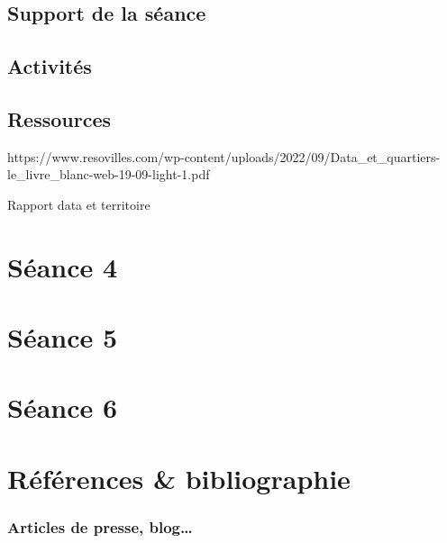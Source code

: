 \documentclass[
  letterpaper,
  DIV=11,
  numbers=noendperiod]{scrreprt}
\begin{document}
\hypertarget{support-de-la-suxe9ance-1}{%
\section{Support de la séance}\label{support-de-la-suxe9ance-1}}

\hypertarget{activituxe9s-1}{%
\section{Activités}\label{activituxe9s-1}}

\hypertarget{ressources-1}{%
\section{Ressources}\label{ressources-1}}

https://www.resovilles.com/wp-content/uploads/2022/09/Data\_et\_quartiers-le\_livre\_blanc-web-19-09-light-1.pdf

Rapport data et territoire


\hypertarget{suxe9ance-4}{%
\chapter{Séance 4}\label{suxe9ance-4}}


\hypertarget{suxe9ance-5}{%
\chapter{Séance 5}\label{suxe9ance-5}}


\hypertarget{suxe9ance-6}{%
\chapter{Séance 6}\label{suxe9ance-6}}


\hypertarget{ruxe9fuxe9rences-bibliographie}{%
\chapter*{Références \&
bibliographie}\label{ruxe9fuxe9rences-bibliographie}}

\hypertarget{articles-de-presse-blog}{%
\subsection*{Articles de presse,
blog\ldots{}}\label{articles-de-presse-blog}}
\end{document}
